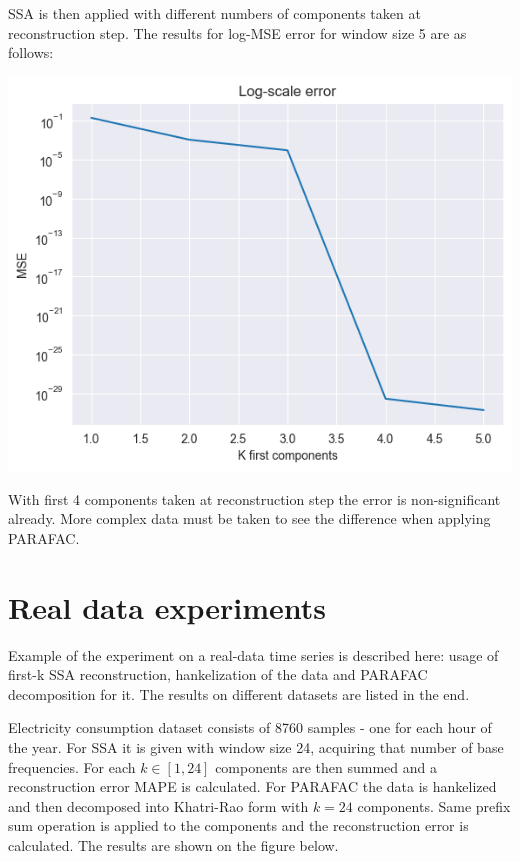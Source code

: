 \documentclass{article}
\begin{document}
SSA is then applied with different numbers of components taken at reconstruction step. The results for log-MSE error for window size 5 are as follows:

\includegraphics[scale=0.7]{./images/fig2.png}

With first 4 components taken at reconstruction step the error is non-significant already. More complex data must be taken to see the difference when applying PARAFAC.

\section{Real data experiments}

Example of the experiment on a real-data time series is described here: usage of first-k SSA reconstruction, hankelization of the data and PARAFAC decomposition for it. The results on different datasets are listed in the end.

Electricity consumption dataset consists of 8760 samples - one for each hour of the year. For SSA it is given with window size 24, acquiring that number of base frequencies. For each \(k \in [1, 24]\) components are then summed and a reconstruction error MAPE is calculated. For PARAFAC the data is hankelized and then decomposed into Khatri-Rao form with \(k = 24\) components. Same prefix sum operation is applied to the components and the reconstruction error is calculated. The results are shown on the figure below.
\end{document}
